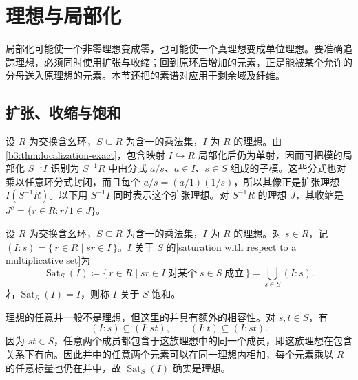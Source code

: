 
\section{理想与局部化}
\label{b3:sec:0202}

局部化可能使一个非零理想变成零，也可能使一个真理想变成单位理想。要准确追踪理想，必须同时使用扩张与收缩；回到原环后增加的元素，正是能被某个允许的分母送入原理想的元素。本节还把的素谱对应用于剩余域及纤维。

\subsection{扩张、收缩与饱和}
\label{b3:subsec:0202:01}

设 \(R\) 为交换含幺环，\(S\subseteq R\) 为含一的乘法集，\(I\) 为 \(R\) 的理想。由\cref{b3:thm:localization-exact}，包含映射 \(I\hookrightarrow R\) 局部化后仍为单射，因而可把模的局部化 \(S^{-1}I\) 识别为 \(S^{-1}R\) 中由分式 \(a/s\)、\(a\in I\)、\(s\in S\) 组成的子模。这些分式也对乘以任意环分式封闭，而且每个 \(a/s=(a/1)(1/s)\)，所以其像正是扩张理想 \(I(S^{-1}R)\)。以下用 \(S^{-1}I\) 同时表示这个扩张理想。对 \(S^{-1}R\) 的理想 \(J\)，其收缩是 \(J^c=\{r\in R:r/1\in J\}\)。

\begin{definition}\label{b3:def:multiplicative-saturation}
	设 \(R\) 为交换含幺环，\(S\subseteq R\) 为含一的乘法集，\(I\) 为 \(R\) 的理想。对 \(s\in R\)，记 \((I:s)=\{\,r\in R\mid sr\in I\,\}\)。\(I\) 关于 \(S\) 的[saturation with respect to a multiplicative set]为
	\[
		\operatorname{Sat}_S(I)\coloneqq \{\,r\in R\mid sr\in I\;\text{对某个}\;s\in S\;\text{成立}\,\} =\bigcup_{s\in S}(I:s).
	\]
	若 \(\operatorname{Sat}_S(I)=I\)，则称 \(I\) 关于 \(S\) 饱和。
\end{definition}

理想的任意并一般不是理想，但这里的并具有额外的相容性。对 \(s,t\in S\)，有
\[
	(I:s)\subseteq(I:st),\qquad (I:t)\subseteq(I:st).
\]
因为 \(st\in S\)，任意两个成员都包含于这族理想中的同一个成员，即这族理想在包含关系下有向。因此并中的任意两个元素可以在同一理想内相加，每个元素乘以 \(R\) 的任意标量也仍在并中，故 \(\operatorname{Sat}_S(I)\) 确实是理想。

